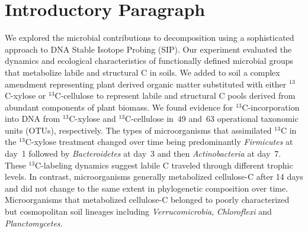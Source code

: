 \section{Introductory Paragraph} We explored the microbial contributions to
decomposition using a sophisticated approach to DNA Stable Isotope Probing
(SIP). Our experiment evaluated the dynamics and ecological characteristics of
functionally defined microbial groups that metabolize labile and structural C
in soils. We added to soil a complex amendment representing plant derived
organic matter substituted with either  $^{13}$C-xylose or $^{13}$C-cellulose
to represent labile and structural C pools derived from abundant components of
plant biomass. We found evidence for $^{13}$C-incorporation into DNA from
$^{13}$C-xylose and $^{13}$C-cellulose in~49 and~63 operational taxonomic
units (OTUs), respectively. The types of microorganisms that assimilated
$^{13}$C in the $^{13}$C-xylose treatment changed over time being predominantly
\textit{Firmicutes} at day~1 followed by \textit{Bacteroidetes} at day~3 and
then \textit{Actinobacteria} at day~7. These $^{13}$C-labeling dynamics 
suggest labile C traveled through different trophic levels. In contrast,
microorganisms generally metabolized cellulose-C after 14 days and did not
change to the same extent in phylogenetic composition over time. Microorganisms
that metabolized cellulose-C belonged to poorly characterized but cosmopolitan
soil lineages including \textit{Verrucomicrobia}, \textit{Chloroflexi} and
\textit{Planctomycetes}.
